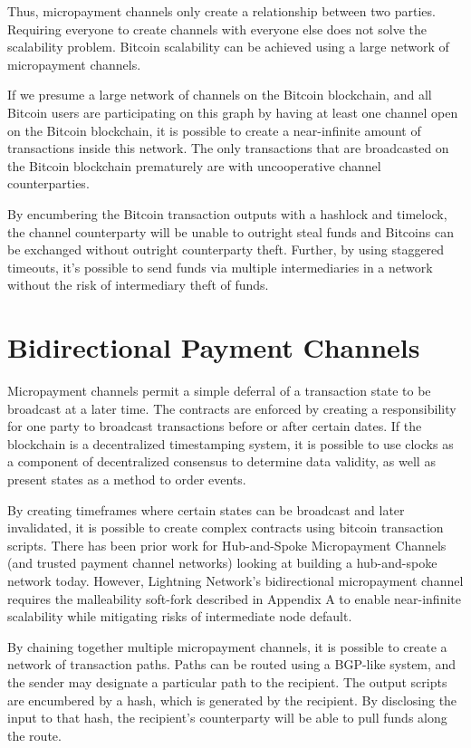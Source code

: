 \documentclass[letterpaper,11pt]{article}
\begin{document}
Thus, micropayment channels only create a relationship between two parties.
Requiring everyone to create channels with everyone else does not solve the
scalability problem. Bitcoin scalability can be achieved using a large network
of micropayment channels.

If we presume a large network of channels on the Bitcoin blockchain, and all
Bitcoin users are participating on this graph by having at least one channel
open on the Bitcoin blockchain, it is possible to create a near-infinite amount
of transactions inside this network. The only transactions that are broadcasted
on the Bitcoin blockchain prematurely are with uncooperative channel
counterparties.

By encumbering the Bitcoin transaction outputs with a hashlock and timelock,
the channel counterparty will be unable to outright steal funds and Bitcoins
can be exchanged without outright counterparty theft. Further, by using
staggered timeouts, it's possible to send funds via multiple intermediaries in a
network without the risk of intermediary theft of funds.

\section{Bidirectional Payment Channels}

Micropayment channels permit a simple deferral of a transaction state to be
broadcast at a later time. The contracts are enforced by creating a
responsibility for one party to broadcast transactions before or after certain
dates. If the blockchain is a decentralized timestamping system, it is possible
to use clocks as a component of decentralized consensus\cite{lamportpaxos} to
determine data validity, as well as present states as a method to order
events\cite{lamportclocks}.

By creating timeframes where certain states can be broadcast and later
invalidated, it is possible to create complex contracts using bitcoin
transaction scripts. There has been prior work for Hub-and-Spoke Micropayment
Channels\cite{akselrod}\cite{akselrod2}\cite{todd} (and trusted payment channel
networks\cite{amikopay}\cite{impulse}) looking at building a hub-and-spoke
network today. However, Lightning Network's bidirectional micropayment channel
requires the malleability soft-fork described in Appendix A to enable
near-infinite scalability while mitigating risks of intermediate node default.

By chaining together multiple micropayment channels, it is possible to create a
network of transaction paths. Paths can be routed using a BGP-like system, and
the sender may designate a particular path to the recipient. The output scripts
are encumbered by a hash, which is generated by the recipient. By disclosing
the input to that hash, the recipient's counterparty will be able to pull funds
along the route.
\end{document}
